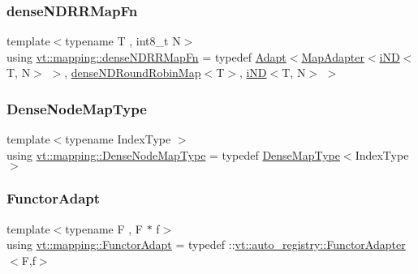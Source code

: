 \subsubsection{\texorpdfstring{dense\+N\+D\+R\+R\+Map\+Fn}{denseNDRRMapFn}}
{\footnotesize\ttfamily template$<$typename T , int8\+\_\+t N$>$ \\
using \hyperlink{namespacevt_1_1mapping_af7eabd4006a3462a6ae120d52cc638a1}{vt\+::mapping\+::dense\+N\+D\+R\+R\+Map\+Fn} = typedef \hyperlink{namespacevt_1_1mapping_aafe187035ce8df02f31983e37cdb6a5d}{Adapt}$<$\hyperlink{namespacevt_1_1mapping_a41b113c28bb6430fbcb5be66e08ccf9f}{Map\+Adapter}$<$\hyperlink{namespacevt_1_1mapping_ad53b53dc14e67437c17cefe9c3c70380}{i\+ND}$<$T, N$>$ $>$, \hyperlink{namespacevt_1_1mapping_a270a829564506d7b8de50c9867ff2b76}{dense\+N\+D\+Round\+Robin\+Map}$<$T$>$, \hyperlink{namespacevt_1_1mapping_ad53b53dc14e67437c17cefe9c3c70380}{i\+ND}$<$T, N$>$ $>$}

\mbox{\label{namespacevt_1_1mapping_a224f382367a2c65c3be2a9f91f89ffd5}} 
\subsubsection{\texorpdfstring{Dense\+Node\+Map\+Type}{DenseNodeMapType}}
{\footnotesize\ttfamily template$<$typename Index\+Type $>$ \\
using \hyperlink{namespacevt_1_1mapping_a224f382367a2c65c3be2a9f91f89ffd5}{vt\+::mapping\+::\+Dense\+Node\+Map\+Type} = typedef \hyperlink{namespacevt_1_1mapping_a64f0fc107b569bb6644f1b015c6e7ad8}{Dense\+Map\+Type}$<$Index\+Type$>$}

\mbox{\label{namespacevt_1_1mapping_a9502cb3a918b8389f64351638edab39f}} 
\subsubsection{\texorpdfstring{Functor\+Adapt}{FunctorAdapt}}
{\footnotesize\ttfamily template$<$typename F , F $\ast$ f$>$ \\
using \hyperlink{namespacevt_1_1mapping_a9502cb3a918b8389f64351638edab39f}{vt\+::mapping\+::\+Functor\+Adapt} = typedef \+::\hyperlink{structvt_1_1auto__registry_1_1_functor_adapter}{vt\+::auto\+\_\+registry\+::\+Functor\+Adapter}$<$F,f$>$}

